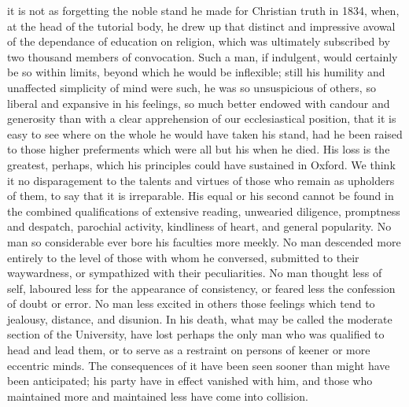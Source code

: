 it is not as forgetting the noble stand he made for Christian truth in
1834, when, at the head of the tutorial body, he drew up that distinct
and impressive avowal of the dependance of education on religion, which
was ultimately subscribed by two thousand members of convocation. Such a
man, if indulgent, would certainly be so within limits, beyond which he
would be inflexible; still his humility and unaffected simplicity of
mind were such, he was so unsuspicious of others, so liberal and
expansive in his feelings, so much better endowed with candour and
generosity than with a clear apprehension of our ecclesiastical
position, that it is easy to see where on the whole he would have taken
his stand, had he been raised to those higher preferments which were all
but his when he died. His loss is the greatest, perhaps, which his
principles could have sustained in Oxford. We think it no disparagement
to the talents and virtues of those who remain as upholders of them, to
say that it is irreparable. His equal or his second cannot be found in
the combined qualifications of extensive reading, unwearied diligence,
promptness and despatch, parochial activity, kindliness of heart, and
general popularity. No man so considerable ever bore his faculties more
meekly. No man descended more entirely to the level of those with whom
he conversed, submitted to their waywardness, or sympathized with their
peculiarities. No man thought less of self, laboured less for the
appearance of consistency, or feared less the confession of doubt or
error. No man less excited in others those feelings which tend to
jealousy, distance, and disunion. In his death, what may be called the
moderate section of the University, have lost perhaps the only man who
was qualified to head and lead them, or to serve as a restraint on
persons of keener or more eccentric minds. The consequences of it have
been seen sooner than might have been anticipated; his party have in
effect vanished with him, and those who maintained more and maintained
less have come into collision.


